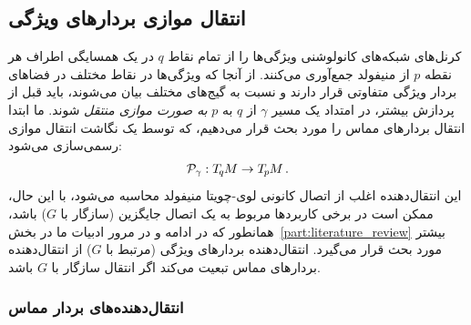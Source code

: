 

\subsection{انتقال موازی بردارهای ویژگی}
\label{sec:transport_local}

کرنل‌های شبکه‌های کانولوشنی ویژگی‌ها را از تمام نقاط $q$ در یک همسایگی اطراف هر نقطه $p$ از منیفولد جمع‌آوری می‌کنند.
از آنجا که ویژگی‌ها در نقاط مختلف در فضاهای بردار ویژگی متفاوتی قرار دارند و نسبت به گیج‌های مختلف بیان می‌شوند، باید قبل از پردازش بیشتر، در امتداد یک مسیر $\gamma$ از $q$ به $p$ \emph{به صورت موازی منتقل} شوند.
ما ابتدا انتقال بردارهای مماس را مورد بحث قرار می‌دهیم، که توسط یک نگاشت انتقال موازی رسمی‌سازی می‌شود:
\begin{align}
    \mathcal{P}_\gamma: T_{\mkern-1.5mu q}\mkern-.5muM \to T_{\mkern-1.5mu p}\mkern-.5muM \,.
\end{align}
این انتقال‌دهنده اغلب از اتصال کانونی لوی-چویتا منیفولد محاسبه می‌شود، با این حال، ممکن است در برخی کاربردها مربوط به یک اتصال جایگزین (سازگار با $G$) باشد، همانطور که در ادامه و در مرور ادبیات ما در بخش~\ref{part:literature_review} بیشتر مورد بحث قرار می‌گیرد.
انتقال‌دهنده بردارهای ویژگی (مرتبط با $G$) از انتقال‌دهنده بردارهای مماس تبعیت می‌کند اگر انتقال سازگار با $G$ باشد.


\subsubsection{انتقال‌دهنده‌های بردار مماس}

